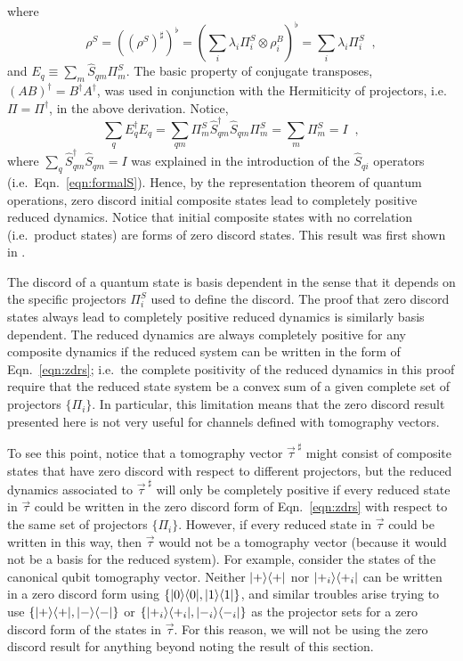 where 
\begin{equation}
\label{eqn:zdrs}
\rho^S = \left(\left(\rho^{S}\right)^\sharp\right)^\flat=\left(\sum_i \lambda_i \Pi^S_i \otimes \rho^B_i\right)^\flat = \sum_i \lambda_i \Pi_i^S\;\;,
\end{equation}
and $E_q \equiv \sum_m \hat{S}_{qm} \Pi^S_m$.  The basic property of conjugate transposes, $(AB)^\dagger=B^\dagger A^\dagger$, was used in conjunction with the Hermiticity of projectors, i.e.\ $\Pi=\Pi^\dagger$, in the above derivation.  Notice,
$$
\sum_q E_q^\dagger E_q = \sum_{qm} \Pi^S_m \hat{S}^\dagger_{qm} \hat{S}_{qm} \Pi^S_m = \sum_m \Pi^S_m = I\;\;,
$$
where $\sum_q \hat{S}^\dagger_{qm} \hat{S}_{qm} = I$ was explained in the introduction of the $\hat{S}_{qi}$ operators (i.e.\ Eqn.\ \ref{eqn:formalS}).  Hence, by the representation theorem of quantum operations, zero discord initial composite states lead to completely positive reduced dynamics.  Notice that initial composite states with no correlation (i.e.\ product states) are forms of zero discord states.  This result was first shown in \cite{Rodriguez2008A}.

The discord of a quantum state is basis dependent in the sense that it depends on the specific projectors $\Pi^S_i$ used to define the discord.  The proof that zero discord states always lead to completely positive reduced dynamics is similarly basis dependent.  The reduced dynamics are always completely positive for any composite dynamics if the reduced system can be written in the form of Eqn.\ \ref{eqn:zdrs}; i.e.\ the complete positivity of the reduced dynamics in this proof require that the reduced state system be a convex sum of a given complete set of projectors $\{\Pi_i\}$.  In particular, this limitation means that the zero discord result presented here is not very useful for channels defined with tomography vectors.

To see this point, notice that a tomography vector $\vec{\tau}^{\;\sharp}$ might consist of composite states that have zero discord with respect to different projectors, but the reduced dynamics associated to $\vec{\tau}^{\;\sharp}$ will only be completely positive if every reduced state in $\vec{\tau}$ could be written in the zero discord form of Eqn.\ \ref{eqn:zdrs} with respect to the same set of projectors $\{\Pi_i\}$.  However, if every reduced state in $\vec{\tau}$ could be written in this way, then $\vec{\tau}$ would not be a tomography vector (because it would not be a basis for the reduced system).  For example, consider the states of the canonical qubit tomography vector.  Neither $|+\rangle\langle+|$ nor $|+_i\rangle\langle+_i|$ can be written in a zero discord form using $\{|0\rangle\langle0|,|1\rangle\langle1|\}$, and similar troubles arise trying to use $\{|+\rangle\langle+|,|-\rangle\langle-|\}$ or $\{|+_i\rangle\langle+_i|,|-_i\rangle\langle-_i|\}$ as the projector sets for a zero discord form of the states in $\vec{\tau}$.  For this reason, we will not be using the zero discord result for anything beyond noting the result of this section. 

